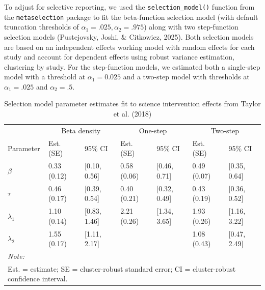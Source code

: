 \documentclass[
  american,
  man, donotrepeattitle,floatsintext]{apa7}
\begin{document}
To adjust for selective reporting, we used the \texttt{selection\_model()} function from the \texttt{metaselection} package to fit the beta-function selection model (with default truncation thresholds of \(\alpha_1 = .025, \alpha_2 = .975\)) along with two step-function selection models (Pustejovsky, Joshi, \& Citkowicz, 2025). Both selection models are based on an independent effects working model with random effects for each study and account for dependent effects using robust variance estimation, clustering by study. For the step-function models, we estimated both a single-step model with a threshold at \(\alpha_1 = 0.025\) and a two-step model with thresholds at \(\alpha_1 = .025\) and \(\alpha_2 = .5\).

\begin{longtable}[t]{lllllll}
\caption{\label{tab:science-learning-res}Selection model parameter estimates fit to science intervention effects from Taylor et al. (2018)}\\
\toprule
\multicolumn{1}{c}{ } & \multicolumn{2}{c}{Beta density} & \multicolumn{2}{c}{One-step} & \multicolumn{2}{c}{Two-step} \\
\cmidrule(l{3pt}r{3pt}){2-3} \cmidrule(l{3pt}r{3pt}){4-5} \cmidrule(l{3pt}r{3pt}){6-7}
Parameter & Est. (SE) & 95\% CI & Est. (SE) & 95\% CI & Est. (SE) & 95\% CI\\
\midrule
$\beta$ & 0.33 (0.12) & {}[0.10, 0.56] & 0.58 (0.06) & {}[0.46, 0.71] & 0.49 (0.07) & {}[0.35, 0.64]\\
$\tau$ & 0.46 (0.17) & {}[0.39, 0.54] & 0.40 (0.21) & {}[0.32, 0.49] & 0.43 (0.19) & {}[0.36, 0.52]\\
$\lambda_1$ & 1.10 (0.14) & {}[0.83, 1.46] & 2.21 (0.26) & {}[1.34, 3.65] & 1.93 (0.26) & {}[1.16, 3.22]\\
$\lambda_2$ & 1.55 (0.17) & {}[1.11, 2.17] &  &  & 1.08 (0.43) & {}[0.47, 2.49]\\
\bottomrule
\multicolumn{7}{l}{\rule{0pt}{1em}\textit{Note: }}\\
\multicolumn{7}{l}{\rule{0pt}{1em}Est. = estimate; SE = cluster-robust standard error; CI = cluster-robust confidence interval.}\\
\end{longtable}
\end{document}
